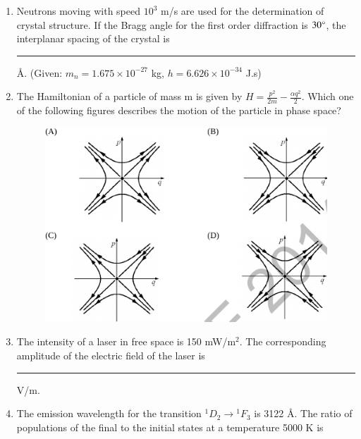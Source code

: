 \documentclass[journal,12pt,onecolumn]{IEEEtran}
\theoremstyle{remark}
\begin{document}
\begin{enumerate}
\item Neutrons moving with speed $10^3$ m/s are used for the determination of crystal structure. If the Bragg angle for the first order diffraction is $30\degree$, the interplanar spacing of the crystal is \rule{3cm}{0.4pt} \AA. (Given: $m_n = 1.675 \times 10^{-27}$ kg, $h = 6.626 \times 10^{-34}$ J.s)\hfill{}

\item The Hamiltonian of a particle of mass m is given by $H = \frac{p^2}{2m} - \frac{\alpha q^2}{2}$. Which one of the following figures describes the motion of the particle in phase space?
\hfill{}
\begin{figure}[H]
\centering
 \caption*{} \label{54} \includegraphics{figs/q54.png}
\end{figure}
\item The intensity of a laser in free space is 150 mW/m$^2$. The corresponding amplitude of the electric field of the laser is \rule{3cm}{0.4pt} V/m. \hfill{}

\item The emission wavelength for the transition ${}^1D_2 \rightarrow {}^1F_3$ is 3122 \AA. The ratio of populations of the final to the initial states at a temperature 5000 K is 
\hfill{} \begin{enumerate}  \end{enumerate}


\end{enumerate}
\end{document}
